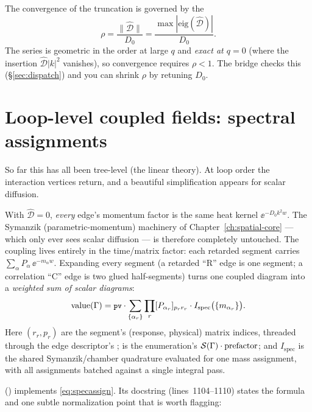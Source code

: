 The convergence of the truncation is governed by the 
\begin{equation}
  \rho=\frac{\lVert\widehat{\mathcal{D}}\rVert}{D_{0}}
       =\frac{\max|\mathrm{eig}(\widehat{\mathcal{D}})|}{D_{0}}.
  \label{eq:rho}
\end{equation}
The series is geometric in the order at large $q$ and \emph{exact at $q=0$}
(where the insertion $\widehat{\mathcal{D}}|k|^{2}$ vanishes), so convergence
requires $\rho<1$. The bridge checks this (\S\ref{sec:dispatch}) and you can
shrink $\rho$ by retuning $D_{0}$.

\section{Loop-level coupled fields: spectral assignments}

So far this has all been tree-level (the linear theory). At loop order the
interaction vertices return, and a beautiful simplification appears for scalar
diffusion.

With $\widehat{\mathcal{D}}=0$, \emph{every} edge's momentum factor is the same
heat kernel $\ee^{-D_{0}k^{2}w}$. The Symanzik (parametric-momentum) machinery
of Chapter~\ref{ch:spatial-core} --- which only ever sees scalar diffusion --- is
therefore completely untouched. The coupling lives entirely in the time/matrix
factor: each retarded segment carries $\sum_{\alpha}P_{\alpha}\,\ee^{-m_{\alpha}w}$.
Expanding every segment (a retarded ``R'' edge is one segment; a correlation
``C'' edge is two glued half-segments) turns one coupled diagram into a
\emph{weighted sum of scalar diagrams}:
\begin{equation}
  \text{value}(\Gamma)=\texttt{\small pv}\cdot
   \sum_{\{\alpha_{r}\}}\prod_{r}[P_{\alpha_{r}}]_{p_{r}r_{r}}\cdot
   I_{\text{spec}}\big(\{m_{\alpha_{r}}\}\big).
  \label{eq:specassign}
\end{equation}
Here $(r_{r},p_{r})$ are the segment's (response, physical) matrix indices,
threaded through the edge descriptor's ;  is the
enumeration's $\mathcal{S}(\Gamma)\cdot\text{prefactor}$; and $I_{\text{spec}}$ is the
shared Symanzik/chamber quadrature evaluated for one mass assignment, with all
assignments batched against a single integral pass.

 ()
implements \eqref{eq:specassign}. Its docstring (lines~1104--1110) states the
formula and one subtle normalization point that is worth flagging:

